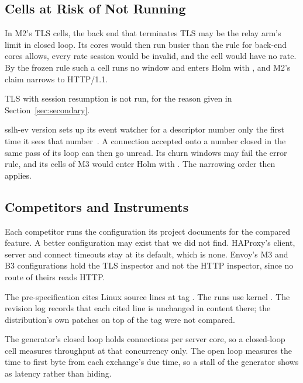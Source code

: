 
\subsection{Cells at Risk of Not Running}\label{sec:threat-cells}

In M2's TLS cells, the back end that terminates TLS may be the relay arm's limit in closed loop.
Its cores would then run busier than the rule for back-end cores allows, every rate session would
be invalid, and the cell would have no rate. By the frozen rule such a cell runs no window and
enters Holm with \PIsOne{}, and M2's claim narrows to HTTP/1.1.

TLS with session resumption is not run, for the reason given in Section~\ref{sec:secondary}.

sslh-ev version \SslhVersion{} sets up its event watcher for a descriptor number only the first
time it sees that number~\cite{sslh2026}. A connection accepted onto a number closed in the same
pass of its loop can then go unread. Its churn windows may fail the error rule, and its cells of M3
would enter Holm with \PIsOne{}. The narrowing order then applies.

\subsection{Competitors and Instruments}\label{sec:threat-instruments}

Each competitor runs the configuration its project documents for the compared feature. A better
configuration may exist that we did not find. HAProxy's client, server and connect timeouts stay
at its default, which is none. Envoy's M3 and B3 configurations hold the TLS inspector and not the
HTTP inspector, since no route of theirs reads HTTP.

The pre-specification cites Linux source lines at tag \KernelTag. The runs use kernel \KernelL. The
revision log records that each cited line is unchanged in content there; the distribution's own
patches on top of the tag were not compared.

The generator's closed loop holds \ConnSlots{} connections per server core, so a closed-loop cell
measures throughput at that concurrency only. The open loop measures the time to first byte from
each exchange's due time, so a stall of the generator shows as latency rather than hiding.
